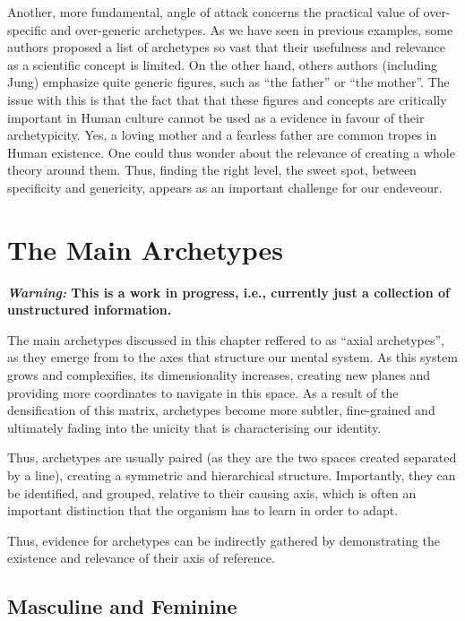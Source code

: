 \documentclass[
]{book}
\begin{document}
Another, more fundamental, angle of attack concerns the practical value of over-specific and over-generic archetypes. As we have seen in previous examples, some authors proposed a list of archetypes so vast that their usefulness and relevance as a scientific concept is limited. On the other hand, others authors (including Jung) emphasize quite generic figures, such as ``the father'' or ``the mother''. The issue with this is that the fact that that these figures and concepts are critically important in Human culture cannot be used as a evidence in favour of their archetypicity. Yes, a loving mother and a fearless father are common tropes in Human existence. One could thus wonder about the relevance of creating a whole theory around them. Thus, finding the right level, the sweet spot, between specificity and genericity, appears as an important challenge for our endeveour.

\hypertarget{the-main-archetypes}{%
\chapter{The Main Archetypes}\label{the-main-archetypes}}

\textbf{\emph{Warning:} This is a work in progress, i.e., currently just a collection of unstructured information.}

The main archetypes discussed in this chapter reffered to as ``axial archetypes'', as they emerge from to the axes that structure our mental system. As this system grows and complexifies, its dimensionality increases, creating new planes and providing more coordinates to navigate in this space. As a result of the densification of this matrix, archetypes become more subtler, fine-grained and ultimately fading into the unicity that is characterising our identity.

Thus, archetypes are usually paired (as they are the two spaces created separated by a line), creating a symmetric and hierarchical structure. Importantly, they can be identified, and grouped, relative to their causing axis, which is often an important distinction that the organism has to learn in order to adapt.

Thus, evidence for archetypes can be indirectly gathered by demonstrating the existence and relevance of their axis of reference.

\hypertarget{masculine-and-feminine}{%
\section{Masculine and Feminine}\label{masculine-and-feminine}}
\end{document}
